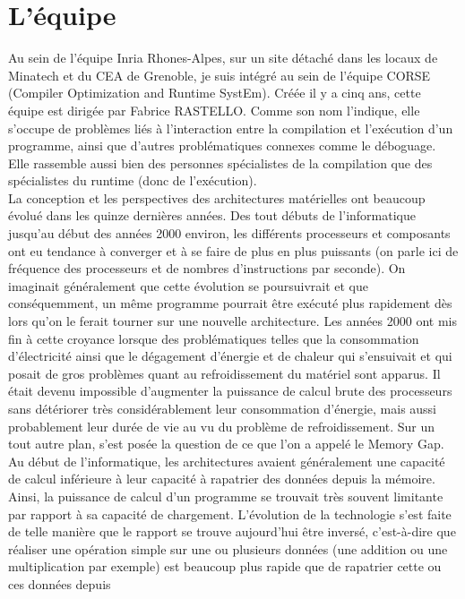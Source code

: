 \documentclass{report}
\begin{document}
\section{L'équipe}

Au sein de l'équipe Inria Rhones-Alpes, sur un site détaché dans les locaux de Minatech 
et du CEA de Grenoble, je suis intégré au sein de l'équipe CORSE (Compiler Optimization 
and Runtime SystEm). Créée il y a cinq ans, cette équipe est dirigée par Fabrice RASTELLO.
Comme son nom l'indique, elle s'occupe de problèmes liés à l'interaction entre la compilation
et l'exécution d'un programme, ainsi que d'autres problématiques connexes comme le déboguage.
Elle rassemble aussi bien des personnes spécialistes de la compilation que des spécialistes 
du runtime (donc de l'exécution).
\\ La conception et les perspectives des architectures matérielles ont beaucoup évolué dans les 
quinze dernières années.  Des tout débuts de l'informatique jusqu'au début des années 2000 
environ, les différents processeurs et composants ont eu tendance à converger et à se faire de
plus en plus puissants (on parle ici de fréquence des processeurs et de nombres d'instructions 
par seconde). On imaginait généralement que cette évolution se poursuivrait et que conséquemment, 
un même programme pourrait être exécuté plus rapidement dès lors qu'on le ferait tourner sur une 
nouvelle architecture. Les années 2000 ont mis fin à cette croyance lorsque des problématiques 
telles que la consommation d'électricité ainsi que le dégagement d'énergie et de chaleur qui 
s'ensuivait et qui posait de gros problèmes quant au refroidissement du matériel sont apparus. Il 
était devenu impossible d'augmenter la puissance de calcul brute des processeurs sans détériorer 
très considérablement leur consommation d'énergie, mais aussi probablement leur durée de vie au vu du 
problème de refroidissement. Sur un tout autre plan, s'est posée la question de ce que l'on a 
appelé le Memory Gap.  Au début de l'informatique, les architectures avaient généralement une capacité
de calcul inférieure à leur capacité à rapatrier des données depuis la mémoire. Ainsi, la puissance de
calcul d'un programme se trouvait très souvent limitante par rapport à sa capacité de chargement. 
L'évolution de la technologie s'est faite de telle manière que le rapport se trouve aujourd'hui 
être inversé, c'est-à-dire que réaliser une opération simple sur une ou plusieurs données (une addition
ou une multiplication par exemple) est beaucoup plus rapide que de rapatrier cette ou ces données depuis
\end{document}
